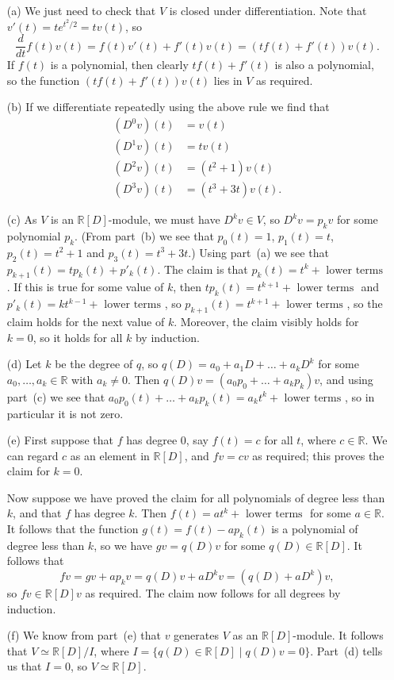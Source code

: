 \documentclass{amsart}
\newcommand{\R}         {{\mathbb{R}}}
\newcommand{\st}        {\;|\;}
\renewcommand{\:}{\colon}
\theoremstyle{definition}
\renewenvironment{solution}{\SolutionAtEnd}{\endSolutionAtEnd}
\begin{document}
\begin{solution}
 \begin{itemize}
  \item[(a)] We just need to check that $V$ is closed under
   differentiation.  Note that $v'(t)=te^{t^2/2}=tv(t)$, so 
   \[ \frac{d}{dt}f(t)v(t) = f(t)v'(t) + f'(t)v(t) = 
        (tf(t)+f'(t)) v(t).
   \]
   If $f(t)$ is a polynomial, then clearly $tf(t)+f'(t)$ is also a
   polynomial, so the function $(tf(t)+f'(t))v(t)$ lies in $V$ as
   required.
  \item[(b)] If we differentiate repeatedly using the above rule we
   find that 
   \begin{align*}
    (D^0 v)(t) &=   v(t) \\
    (D^1 v)(t) &= t v(t) \\
    (D^2 v)(t) &= (t^2+1) v(t) \\
    (D^3 v)(t) &= (t^3+3t) v(t).
   \end{align*}
  \item[(c)] As $V$ is an $\R[D]$-module, we must have $D^kv\in V$, so
   $D^kv=p_kv$ for some polynomial $p_k$.  (From part~(b) we see that
   $p_0(t)=1$, $p_1(t)=t$, $p_2(t)=t^2+1$ and $p_3(t)=t^3+3t$.)  Using
   part~(a) we see that $p_{k+1}(t)=tp_k(t)+p'_k(t)$.  The
   claim is that $p_k(t)=t^k+\text{ lower terms }$.  If this is true
   for some value of $k$, then $tp_k(t)=t^{k+1}+\text{ lower terms }$
   and $p'_k(t)=kt^{k-1}+\text{ lower terms }$, so
   $p_{k+1}(t)=t^{k+1}+\text{ lower terms }$, so the claim holds for
   the next value of $k$.  Moreover, the claim visibly holds for
   $k=0$, so it holds for all $k$ by induction.
  \item[(d)] Let $k$ be the degree of $q$, so
   $q(D)=a_0+a_1D+\ldots+a_kD^k$ for some $a_0,\ldots,a_k\in\R$ with
   $a_k\neq 0$.  Then $q(D)v=(a_0p_0+\ldots+a_kp_k)v$, and using
   part~(c) we see that
   $a_0p_0(t)+\ldots+a_kp_k(t)=a_kt^k+\text{ lower terms }$, so in
   particular it is not zero.
  \item[(e)] First suppose that $f$ has degree $0$, say $f(t)=c$ for
   all $t$, where $c\in\R$.  We can regard $c$ as an element in
   $\R[D]$, and $fv=cv$ as required; this proves the claim for $k=0$.

   Now suppose we have proved the claim for all polynomials of degree
   less than $k$, and that $f$ has degree $k$.  Then
   $f(t)=at^k+\text{ lower terms }$ for some $a\in\R$.  It follows
   that the function $g(t)=f(t)-ap_k(t)$ is a polynomial of degree
   less than $k$, so we have $gv=q(D)v$ for some $q(D)\in\R[D]$.  It
   follows that 
   \[ fv = gv + ap_kv = q(D)v + a D^kv = (q(D)+aD^k)v, \]
   so $fv\in\R[D]v$ as required.  The claim now follows for all
   degrees by induction.
  \item[(f)] We know from part~(e) that $v$ generates $V$ as an
   $\R[D]$-module.  It follows that $V\simeq\R[D]/I$, where
   $I=\{q(D)\in\R[D]\st q(D)v=0\}$.  Part~(d) tells us that $I=0$, so
   $V\simeq\R[D]$.
 \end{itemize}
\end{solution}
\end{document}
